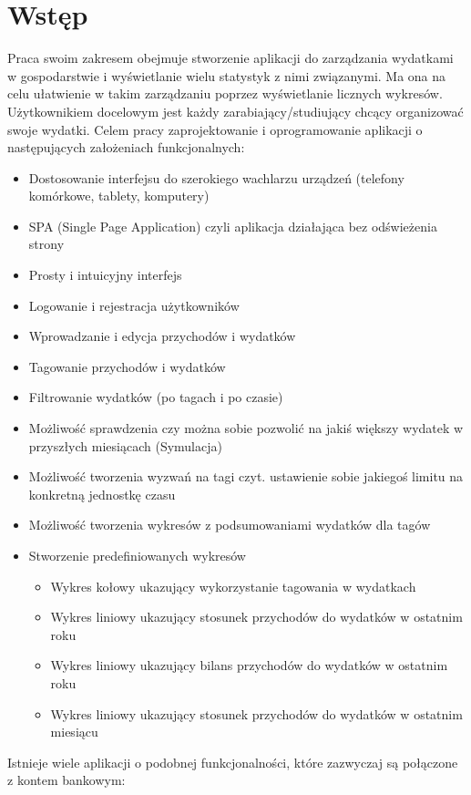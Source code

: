 \documentclass[10pt,titlepage]{article}
\begin{document}
\section*{Wstęp}
Praca swoim zakresem obejmuje stworzenie aplikacji do zarządzania wydatkami w gospodarstwie i wyświetlanie wielu statystyk z nimi związanymi. Ma ona na celu ułatwienie w takim zarządzaniu poprzez wyświetlanie licznych wykresów. Użytkownikiem docelowym jest każdy zarabiający/studiujący chcący organizować swoje wydatki. Celem pracy zaprojektowanie i oprogramowanie aplikacji o następujących założeniach funkcjonalnych:
\begin{itemize}
  \item Dostosowanie interfejsu do szerokiego wachlarzu urządzeń (telefony komórkowe, tablety, komputery)
  \item SPA (Single Page Application) czyli aplikacja działająca bez odświeżenia strony
  \item Prosty i intuicyjny interfejs
  \item Logowanie i rejestracja użytkowników
  \item Wprowadzanie i edycja przychodów i wydatków
  \item Tagowanie przychodów i wydatków
  \item Filtrowanie wydatków (po tagach i po czasie)
  \item Możliwość sprawdzenia czy można sobie pozwolić na jakiś większy wydatek w przyszłych miesiącach (Symulacja)
  \item Możliwość tworzenia wyzwań na tagi czyt. ustawienie sobie jakiegoś limitu na konkretną jednostkę czasu
  \item Możliwość tworzenia wykresów z podsumowaniami wydatków dla tagów
  \item Stworzenie predefiniowanych wykresów
    \begin{itemize}
      \item Wykres kołowy ukazujący wykorzystanie tagowania w wydatkach
      \item Wykres liniowy ukazujący stosunek przychodów do wydatków w ostatnim roku
      \item Wykres liniowy ukazujący bilans przychodów do wydatków w ostatnim roku
      \item Wykres liniowy ukazujący stosunek przychodów do wydatków w ostatnim miesiącu
    \end{itemize}
\end{itemize}
Istnieje wiele aplikacji o podobnej funkcjonalności, które zazwyczaj są połączone z kontem bankowym:
\end{document}
